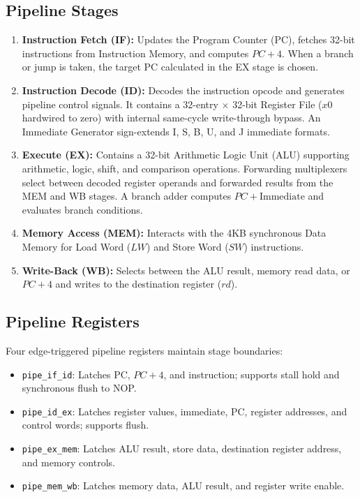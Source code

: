 \documentclass[conference]{IEEEtran}
\begin{document}
\subsection{Pipeline Stages}
\begin{enumerate}
    \item \textbf{Instruction Fetch (IF):} Updates the Program Counter (PC), fetches 32-bit instructions from Instruction Memory, and computes $PC + 4$. When a branch or jump is taken, the target PC calculated in the EX stage is chosen.
    \item \textbf{Instruction Decode (ID):} Decodes the instruction opcode and generates pipeline control signals. It contains a 32-entry $\times$ 32-bit Register File ($x0$ hardwired to zero) with internal same-cycle write-through bypass. An Immediate Generator sign-extends I, S, B, U, and J immediate formats.
    \item \textbf{Execute (EX):} Contains a 32-bit Arithmetic Logic Unit (ALU) supporting arithmetic, logic, shift, and comparison operations. Forwarding multiplexers select between decoded register operands and forwarded results from the MEM and WB stages. A branch adder computes $PC + \text{Immediate}$ and evaluates branch conditions.
    \item \textbf{Memory Access (MEM):} Interacts with the 4KB synchronous Data Memory for Load Word ($LW$) and Store Word ($SW$) instructions.
    \item \textbf{Write-Back (WB):} Selects between the ALU result, memory read data, or $PC+4$ and writes to the destination register ($rd$).
\end{enumerate}

\subsection{Pipeline Registers}
Four edge-triggered pipeline registers maintain stage boundaries:
\begin{itemize}
    \item \texttt{pipe\_if\_id}: Latches PC, $PC+4$, and instruction; supports stall hold and synchronous flush to NOP.
    \item \texttt{pipe\_id\_ex}: Latches register values, immediate, PC, register addresses, and control words; supports flush.
    \item \texttt{pipe\_ex\_mem}: Latches ALU result, store data, destination register address, and memory controls.
    \item \texttt{pipe\_mem\_wb}: Latches memory data, ALU result, and register write enable.
\end{itemize}
\end{document}
